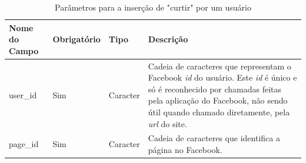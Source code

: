 \documentclass[
	12pt,				%
	oneside,			%
	a4paper,			%
	english,			%
	brazil				%
	]{abntex2ppgsi}
\begin{document}
\begin{apendicesenv}
 \begin{table}[htbp]
	\centering
	\caption{Parâmetros para a inserção de "curtir" por um usuário}
	\begin{tabular}{p{1.5in} p{1in} p{1in} p{1.5in}  } \hline
		Nome do Campo 		& 		Obrigatório 		& 		Tipo 		&		 Descrição \\ \hline
		user\_id			& 		Sim					& Caracter 			&
		Cadeia de caracteres que representam o Facebook \textit{id} do usuário. Este \textit{id} é único e só é reconhecido por chamadas feitas pela aplicação do Facebook, não sendo útil quando chamado diretamente, pela \textit{url} do site. \\
		page\_id			&		Sim					& Caracter 			&        Cadeia de caracteres que identifica a página no Facebook. 		 
	\end{tabular}
	\label{tab:tabelaLikeAdd}
\end{table}


\end{apendicesenv}


\end{document}
